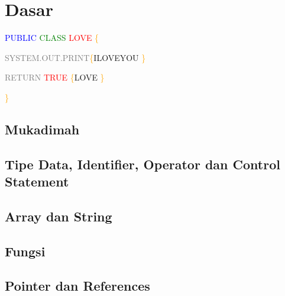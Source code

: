 \documentclass[11pt,b5paper,oneside,titlepage]{book}
\begin{document}
\part{Dasar}

\begingroup
\thispagestyle{empty}
\par\normalfont\fontsize{25}{25}\sffamily\selectfont

\textcolor{blue}{PUBLIC} \textcolor{green}{CLASS} \textcolor{red}{LOVE} \textcolor{orange}{\{}

\textcolor{gray}{SYSTEM.OUT.PRINT}\textcolor{orange}{\{}ILOVEYOU \textcolor{orange}{\}}

\textcolor{gray}{RETURN} \textcolor{red}{TRUE} \textcolor{orange}{\{}LOVE \textcolor{orange}{\}}

\textcolor{orange}{\}}

\endgroup

	\chapter{Mukadimah}\label{mukadimah}
	
	
	\chapter{Tipe Data, Identifier, Operator dan Control Statement}\label{tipe-data-identifier-operator-dan-control-statement}
	
	
	\chapter{Array dan String}\label{array-dan-string}
	
	
	\chapter{Fungsi}
	
	
	\chapter{Pointer dan References}\label{pointer-dan-references}
	

\end{document}
